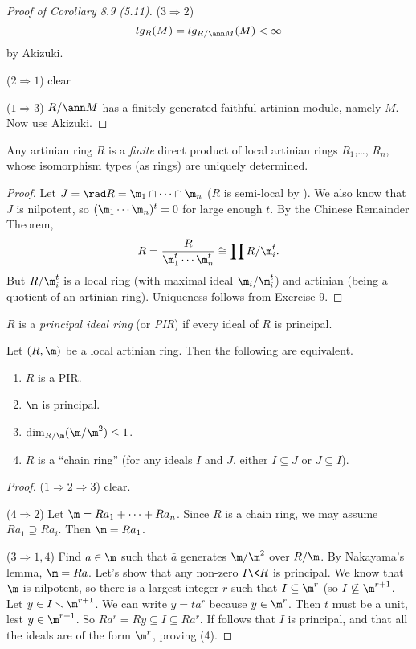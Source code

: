  \begin{proof}[Proof of Corollary 8.9 (5.11)]
   ($3\Rightarrow 2$)
   \[
    lg_R(M)=lg_{R/\ann M}(M) < \infty
   \]
   by Akizuki.

   ($2\Rightarrow 1$) clear

   ($1\Rightarrow 3$) $R/\ann M$ has a finitely generated faithful artinian module,
   namely $M$. Now use Akizuki.
 \end{proof}
 \begin{theorem}
   Any artinian ring $R$ is a \emph{finite} direct product of local artinian rings
   $R_1$,\dots, $R_n$, whose isomorphism types (as rings) are uniquely determined.
 \end{theorem}
 \begin{proof}
   Let $J=\rad R = \m_1\cap\cdots\cap \m_n$ ($R$ is semi-local by \anton{}). We also know
   that $J$ is nilpotent, so $(\m_1\cdots\m_n)^t=0$ for large enough $t$. By the Chinese
   Remainder Theorem,
   \[
     R=\frac{R}{\m_1^t\cdots \m_n^t} \cong \prod R/\m_i^t.
   \]
   But $R/\m_i^t$ is a local ring (with maximal ideal $\m_i/\m_i^t$) and artinian (being
   a quotient of an artinian ring). Uniqueness follows from Exercise 9.
 \end{proof}
 \begin{definition}
   $R$ is a \emph{principal ideal ring} (or \emph{PIR}) if every ideal of $R$ is
   principal.
 \end{definition}
 \begin{theorem}[5.13]
   Let $(R,\m)$ be a local artinian ring. Then the following are equivalent.
   \begin{enumerate}
     \item $R$ is a PIR.
     \item $\m$ is principal.
     \item $\dim_{R/\m}(\m/\m^2)\le 1$.
     \item $R$ is a ``chain ring'' (for any ideals $I$ and $J$, either $I\subseteq J$ or
     $J\subseteq I$).
   \end{enumerate}
 \end{theorem}
 \begin{proof}
   ($1\Rightarrow 2\Rightarrow 3$) clear.

   ($4\Rightarrow 2$) Let $\m=Ra_1+\cdots + Ra_n$. Since $R$ is a chain ring, we may
   assume $Ra_1\supseteq Ra_i$. Then $\m = Ra_1$.

   ($3\Rightarrow 1,4$) Find $a\in \m$ such that $\bar a$ generates $\m/\m^2$ over
   $R/\m$. By Nakayama's lemma, $\m = Ra$. Let's show that any non-zero $I\< R$ is
   principal. We know that $\m$ is nilpotent, so there is a largest integer $r$ such that
   $I\subseteq \m^r$ (so $I\not\subseteq \m^{r+1}$. Let $y\in I\smallsetminus \m^{r+1}$.
   We can write $y=ta^r$ because $y\in \m^r$. Then $t$ must be a unit, lest $y\in
   \m^{r+1}$. So $Ra^r=Ry\subseteq I\subseteq Ra^r$. If follows that $I$ is principal,
   and that all the ideals are of the form $\m^r$, proving (4).
 \end{proof}
